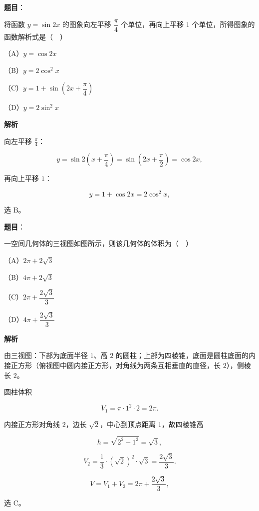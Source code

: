\begin{answer}

\textbf{题目}：

将函数 $y=\sin2x$ 的图象向左平移 $\dfrac{\pi}{4}$ 个单位，再向上平移 $1$ 个单位，所得图象的函数解析式是（　）

（A）$y=\cos2x$

（B）$y=2\cos^2x$

（C）$y=1+\sin\left(2x+\dfrac{\pi}{4}\right)$

（D）$y=2\sin^2x$

\textbf{解析}

向左平移 $\frac\pi4$：

\nopagebreak[4]
\[y=\sin2\left(x+\frac\pi4\right)=\sin\left(2x+\frac\pi2\right)=\cos2x,\]

再向上平移 $1$：

\nopagebreak[4]
\[y=1+\cos2x=2\cos^2x,\]

选 B。


\end{answer}
\begin{answer}

\textbf{题目}：

一空间几何体的三视图如图所示，则该几何体的体积为（　）

（A）$2\pi+2\sqrt3$

（B）$4\pi+2\sqrt3$

（C）$2\pi+\dfrac{2\sqrt3}{3}$

（D）$4\pi+\dfrac{2\sqrt3}{3}$
\nopagebreak[4]
\begin{center}\end{center}
\nopagebreak[4]
\textbf{解析}

由三视图：下部为底面半径 $1$、高 $2$ 的圆柱；上部为四棱锥，底面是圆柱底面的内接正方形（俯视图中圆内接正方形，对角线为两条互相垂直的直径，长 $2$），侧棱长 $2$。

圆柱体积

\nopagebreak[4]
\[V_1=\pi\cdot1^2\cdot2=2\pi .\]

内接正方形对角线 $2$，边长 $\sqrt2$，中心到顶点距离 $1$，故四棱锥高

\nopagebreak[4]
\[h=\sqrt{2^2-1^2}=\sqrt3,\]

\nopagebreak[4]
\[V_2=\frac13\cdot(\sqrt2)^2\cdot\sqrt3=\frac{2\sqrt3}{3}.\]

\nopagebreak[4]
\[V=V_1+V_2=2\pi+\frac{2\sqrt3}{3},\]

选 C。


\end{answer}
